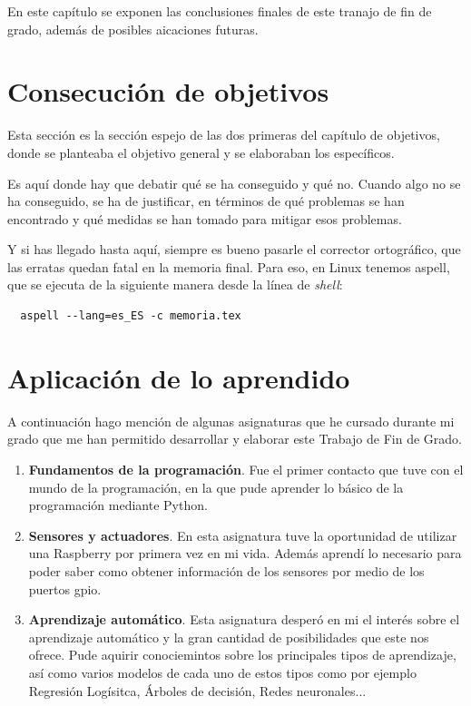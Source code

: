 \documentclass[a4paper, 12pt]{book}
\begin{document}
En este capítulo se exponen las conclusiones finales de este tranajo de fin de grado, además de posibles aicaciones futuras.

\section{Consecución de objetivos}
\label{sec:consecucion-objetivos}

Esta sección es la sección espejo de las dos primeras del capítulo de objetivos, donde se planteaba el objetivo general y se elaboraban los específicos.

Es aquí donde hay que debatir qué se ha conseguido y qué no. 
Cuando algo no se ha conseguido, se ha de justificar, en términos de qué problemas se han encontrado y qué medidas se han tomado para mitigar esos problemas.

Y si has llegado hasta aquí, siempre es bueno pasarle el corrector ortográfico, que las erratas quedan fatal en la memoria final.
Para eso, en Linux tenemos aspell, que se ejecuta de la siguiente manera desde la línea de \emph{shell}:

\begin{verbatim}
  aspell --lang=es_ES -c memoria.tex
\end{verbatim}

\section{Aplicación de lo aprendido}
\label{sec:aplicacion}

A continuación hago mención de algunas asignaturas que he cursado durante mi grado que me han permitido desarrollar y elaborar este Trabajo de Fin de Grado.

\begin{enumerate}
    \item \textbf{Fundamentos de la programación}. Fue el primer contacto que tuve con el mundo de la programación, en la que pude aprender lo básico de la programación mediante Python.

    \item \textbf{Sensores y actuadores}. En esta asignatura tuve la oportunidad de utilizar una Raspberry por primera vez en mi vida. Además aprendí lo necesario para poder saber como obtener información de los sensores por medio de los puertos gpio.
    
    \item \textbf{Aprendizaje automático}. Esta asignatura desperó en mi el interés sobre el aprendizaje automático y la gran cantidad de posibilidades que este nos ofrece. Pude aquirir conociemintos sobre los principales tipos de aprendizaje, así como varios modelos de cada uno de estos tipos como por ejemplo Regresión Logísitca, Árboles de decisión, Redes neuronales...

\end{enumerate}
\end{document}
